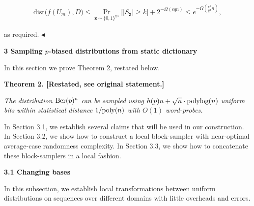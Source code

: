 \[\begin{gathered}
\displaystyle\mathrm{dist}\bigl(f(U_{m}),D\bigr)\leq\Pr_{\boldsymbol{z}\sim\{0,1\}^{qn}}\bigl[\lvert S_{\boldsymbol{z}}\rvert\geq k\bigr]+2^{-\Omega(\epsilon qn)}\leq e^{-\Omega(\frac{\epsilon^{3}}{q^{2}}n)},
\end{gathered}\]


as required.
$\blacktriangleleft$\par






\par\medskip\noindent\textbf{
3 Sampling $p$-biased distributions from static dictionary}\par




In this section we prove Theorem 2, restated below.\par






\par\medskip\noindent\textbf{
\textbf{Theorem 2}\textbf{.}
[Restated, see original statement.]}\par



\emph{The distribution $\textnormal{Ber}(p)^{n}$ can be sampled using $h(p)n+\sqrt{n}\cdot\textnormal{polylog}(n)$ uniform bits within statistical distance $1/\textnormal{poly}(n)$ with $O(1)$ word-probes.}\par







In Section 3.1, we establish several claims that will be used in our construction.
In Section 3.2, we show how to construct a local block-sampler with near-optimal average-case randomness complexity.
In Section 3.3, we show how to concatenate these block-samplers in a local fashion.\par




\par\medskip\noindent\textbf{
3.1 Changing bases}\par




In this subsection, we establish local transformations between uniform distributions on sequences over different domains with little overheads and errors.\par



